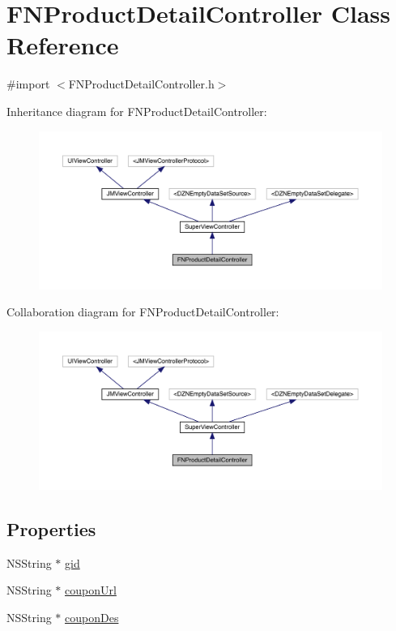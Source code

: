 \hypertarget{interface_f_n_product_detail_controller}{}\section{F\+N\+Product\+Detail\+Controller Class Reference}
\label{interface_f_n_product_detail_controller}


{\ttfamily \#import $<$F\+N\+Product\+Detail\+Controller.\+h$>$}



Inheritance diagram for F\+N\+Product\+Detail\+Controller\+:\nopagebreak
\begin{figure}[H]
\begin{center}
\leavevmode
\includegraphics[width=350pt]{interface_f_n_product_detail_controller__inherit__graph}
\end{center}
\end{figure}


Collaboration diagram for F\+N\+Product\+Detail\+Controller\+:\nopagebreak
\begin{figure}[H]
\begin{center}
\leavevmode
\includegraphics[width=350pt]{interface_f_n_product_detail_controller__coll__graph}
\end{center}
\end{figure}
\subsection*{Properties}
\begin{DoxyCompactItemize}
\item 
N\+S\+String $\ast$ \mbox{\hyperlink{interface_f_n_product_detail_controller_ae35637b78716e81fe6fb4c8d1447d870}{gid}}
\item 
N\+S\+String $\ast$ \mbox{\hyperlink{interface_f_n_product_detail_controller_ac90f87110c090db9f5eed494b5dcb194}{coupon\+Url}}
\item 
N\+S\+String $\ast$ \mbox{\hyperlink{interface_f_n_product_detail_controller_a8155fdc2023786d78ae6d852aac18602}{coupon\+Des}}
\end{DoxyCompactItemize}
